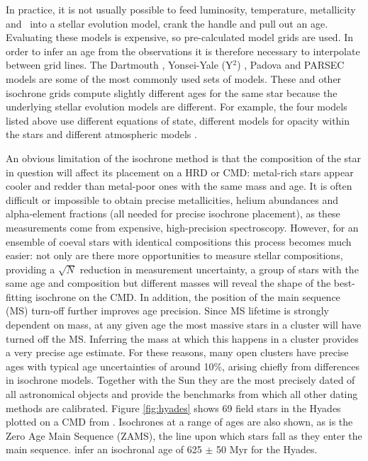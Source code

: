 In practice, it is not usually possible to feed luminosity, temperature,
metallicity and \logg\ into a stellar evolution model, crank the handle and
pull out an age.
Evaluating these models is expensive, so pre-calculated model grids are used.
In order to infer an age from the observations it is therefore necessary to
interpolate between grid lines.
The Dartmouth \citep{Dotter2008}, Yonsei-Yale (Y$^2$) \citep{Yi2001,
Spada2013}, Padova \citep{Girardi2002} and PARSEC \citep{Bressan2012} models
are some of the most commonly used sets of models.
These and other isochrone grids compute slightly different ages for the same
star because the underlying stellar evolution models are different.
For example, the four models listed above use different equations of state,
different models for opacity within the stars and different atmospheric
models \citep[see][for a comparison of these four sets of
isochrones]{Thompson2014}.

An obvious limitation of the isochrone method is that the composition of the
star in question will affect its placement on a HRD or CMD: metal-rich stars
appear cooler and redder than metal-poor ones with the same mass and age.
It is often difficult or impossible to obtain precise metallicities, helium
abundances and alpha-element fractions (all needed for precise isochrone
placement), as these measurements come from expensive, high-precision
spectroscopy.
However, for an ensemble of coeval stars with identical compositions this
process becomes much easier: not only are there more opportunities to measure
stellar compositions, providing a $\sqrt N$ reduction in measurement
uncertainty, a group of stars with the same age and composition but different
masses will reveal the shape of the best-fitting isochrone on the CMD\@.
In addition, the position of the main sequence (MS) turn-off further improves
age precision.
Since MS lifetime is strongly dependent on mass, at any given age the most
massive stars in a cluster will have turned off the MS.
Inferring the mass at which this happens in a cluster provides a very precise
age estimate.
For these reasons, many open clusters have precise ages with typical age
uncertainties of around 10\%, arising chiefly from differences in isochrone
models.
Together with the Sun they are the most precisely dated of all astronomical
objects and provide the benchmarks from which all other dating methods are
calibrated.
Figure \ref{fig:hyades} shows 69 field stars in the Hyades plotted on a CMD
from \citet{Perryman1998}.
Isochrones at a range of ages are also shown, as is the Zero Age Main Sequence
(ZAMS), the line upon which stars fall as they enter the main sequence.
\citet{Perryman1998} infer an isochronal age of 625 $\pm$ 50 Myr for the
Hyades.

